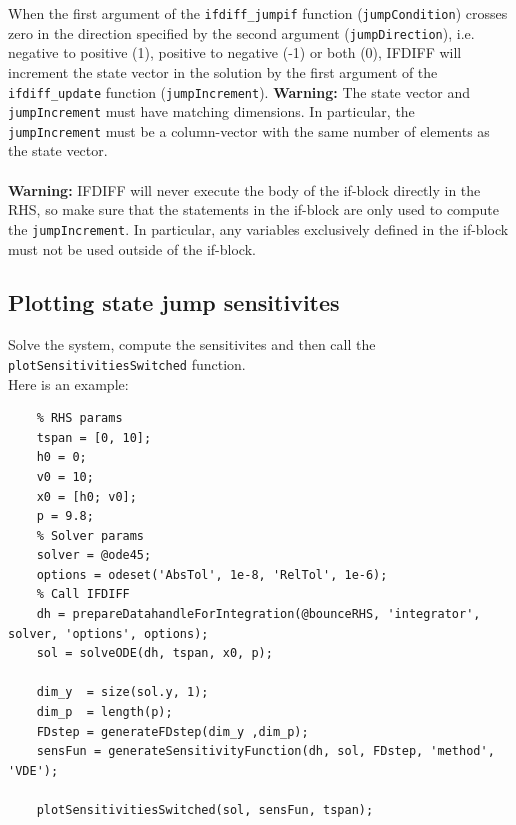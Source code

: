 \noindent When the first argument of the \verb|ifdiff_jumpif| function (\verb|jumpCondition|) crosses zero in the direction specified by the second argument (\verb|jumpDirection|), i.e. negative to positive (1), positive to negative (-1) or both (0), IFDIFF will increment the state vector in the solution by the first argument of the \verb|ifdiff_update| function (\verb|jumpIncrement|).\newline
\textbf{Warning:} The state vector and \verb|jumpIncrement| must have matching dimensions. In particular, the \verb|jumpIncrement| must be a column-vector with the same number of elements as the state vector.\\\\
\textbf{Warning:} IFDIFF will never execute the body of the if-block directly in the RHS, so make sure that the statements in the if-block are only used to compute the \verb|jumpIncrement|. In particular, any variables exclusively defined in the if-block must not be used outside of the if-block.

\subsection*{Plotting state jump sensitivites}
Solve the system, compute the sensitivites and then call the \lstinline!plotSensitivitiesSwitched! function. \\
Here is an example:
\begin{lstlisting}
	% RHS params
	tspan = [0, 10];
	h0 = 0;
	v0 = 10;
	x0 = [h0; v0];
	p = 9.8;
	% Solver params
	solver = @ode45;
	options = odeset('AbsTol', 1e-8, 'RelTol', 1e-6);
	% Call IFDIFF
	dh = prepareDatahandleForIntegration(@bounceRHS, 'integrator', solver, 'options', options);
	sol = solveODE(dh, tspan, x0, p);
	
	dim_y  = size(sol.y, 1);
	dim_p  = length(p);
	FDstep = generateFDstep(dim_y ,dim_p);
	sensFun = generateSensitivityFunction(dh, sol, FDstep, 'method', 'VDE');
	
	plotSensitivitiesSwitched(sol, sensFun, tspan);
\end{lstlisting}